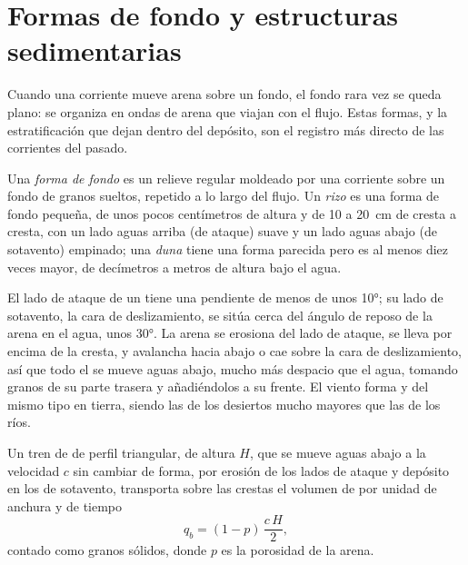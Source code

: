 \section{Formas de fondo y estructuras sedimentarias}\label{sec:b1:clastic-sediments:bedforms}

Cuando una corriente mueve arena sobre un fondo, el fondo rara vez se queda plano: se organiza en ondas de arena que viajan con el flujo. Estas formas, y la estratificación
que dejan dentro del depósito, son el registro más directo de las corrientes del pasado.

\begin{definition}\label{def:b1:clastic-sediments:bedform}
Una \emph{forma de fondo} es un relieve regular moldeado por una corriente sobre un fondo de granos sueltos, repetido a lo largo del flujo. Un
\emph{rizo} es una forma de fondo pequeña, de unos pocos centímetros de altura y de 10 a \qty{20}{cm} de cresta a cresta, con un lado aguas arriba (de ataque)
suave y un lado aguas abajo (de sotavento) empinado; una \emph{duna} tiene una forma parecida pero es al menos diez veces mayor, de decímetros a metros de altura bajo el agua.
\end{definition}

El lado de ataque de un  tiene una pendiente de menos de unos \ang{10}; su lado de sotavento, la cara de deslizamiento, se sitúa cerca del ángulo de reposo de la arena en el agua,
unos \ang{30}. La arena se erosiona del lado de ataque, se lleva por encima de la cresta, y avalancha hacia abajo o cae sobre la cara de deslizamiento, así que todo el  se mueve aguas
abajo, mucho más despacio que el agua, tomando granos de su parte trasera y añadiéndolos a su frente. El viento forma  y  del mismo tipo en tierra, siendo las  de los
desiertos mucho mayores que las de los ríos.

\begin{proposition}\label{prop:b1:clastic-sediments:migration}
Un tren de  de perfil triangular, de altura $H$, que se mueve aguas abajo a la velocidad $c$ sin cambiar de forma, por erosión de los lados de ataque y
depósito en los de sotavento, transporta sobre las crestas el volumen de  por unidad de anchura y de tiempo
\[
  q_b = (1 - p)\,\frac{c\,H}{2},
\]
contado como granos sólidos, donde $p$ es la porosidad de la arena.
\end{proposition}

